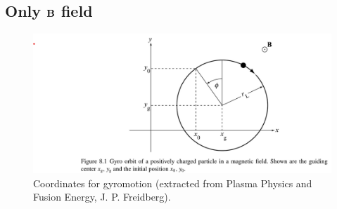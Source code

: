\documentclass[oneside,a4paper,11pt]{report}
\begin{document}
\subsection{Only $\mathbf{B}$ field}
\begin{figure}[ht]
    \centering
    \includegraphics[width=\textwidth]{../../images/gyromotion_coordinates.png}
    \caption{Coordinates for gyromotion (extracted from Plasma Physics and Fusion Energy, J. P. Freidberg).}
    \label{fig:gyromotion_coordiantes}
\end{figure}
\end{document}
